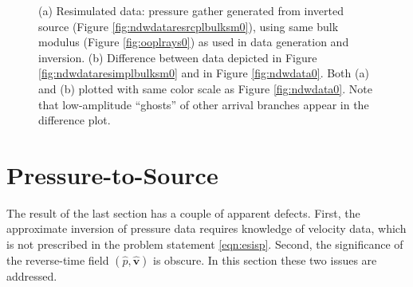 \documentclass[georeport,12pt]{geophysics}
\newcommand{\bv}{\mathbf{v}}
\begin{document}
\begin{figure}
  \centering
  \caption{(a) Resimulated data: pressure gather generated from
    inverted source (Figure \ref{fig:ndwdataresrcplbulksm0}), using same
    bulk modulus (Figure \ref{fig:ooplrays0}) as used in data
    generation and inversion. (b) Difference
    between data depicted in Figure \ref{fig:ndwdataresimplbulksm0} and in Figure \ref{fig:ndwdata0}.
    Both (a) and (b) plotted with same color scale as Figure
    \ref{fig:ndwdata0}. Note that low-amplitude ``ghosts'' of other
    arrival branches appear in the difference plot.}
\end{figure}

\section{Pressure-to-Source}

The result of the last section has a couple of apparent
defects. First, the approximate inversion of pressure data requires
knowledge of velocity data, which is not prescribed in the problem
statement \ref{eqn:esisp}. Second, the significance of the
reverse-time field $(\hat{p},\hat{\bv})$ is obscure. In this section
these two issues are addressed.
\end{document}
